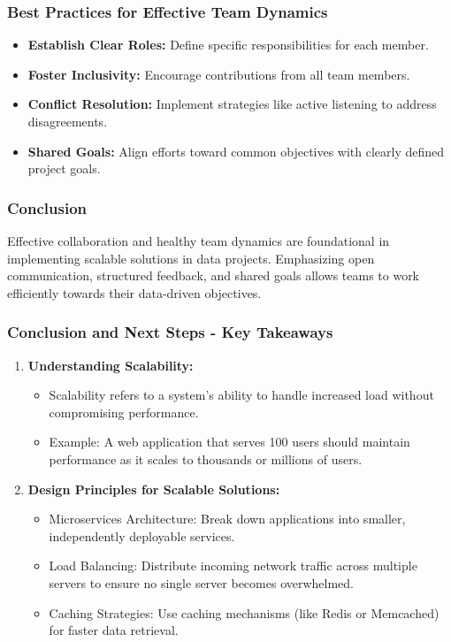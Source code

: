 \documentclass[aspectratio=169]{beamer}
\begin{document}
\begin{frame}[fragile]
    \frametitle{Best Practices for Effective Team Dynamics}
    \begin{itemize}
        \item \textbf{Establish Clear Roles:} Define specific responsibilities for each member.
        \item \textbf{Foster Inclusivity:} Encourage contributions from all team members.
        \item \textbf{Conflict Resolution:} Implement strategies like active listening to address disagreements.
        \item \textbf{Shared Goals:} Align efforts toward common objectives with clearly defined project goals.
    \end{itemize}
\end{frame}

\begin{frame}[fragile]
    \frametitle{Conclusion}
    Effective collaboration and healthy team dynamics are foundational in implementing scalable solutions in data projects. Emphasizing open communication, structured feedback, and shared goals allows teams to work efficiently towards their data-driven objectives.
\end{frame}

\begin{frame}[fragile]
    \frametitle{Conclusion and Next Steps - Key Takeaways}
    
    \begin{enumerate}
        \item \textbf{Understanding Scalability:}
        \begin{itemize}
            \item Scalability refers to a system's ability to handle increased load without compromising performance.
            \item Example: A web application that serves 100 users should maintain performance as it scales to thousands or millions of users.
        \end{itemize}

        \item \textbf{Design Principles for Scalable Solutions:}
        \begin{itemize}
            \item Microservices Architecture: Break down applications into smaller, independently deployable services.
            \item Load Balancing: Distribute incoming network traffic across multiple servers to ensure no single server becomes overwhelmed.
            \item Caching Strategies: Use caching mechanisms (like Redis or Memcached) for faster data retrieval.
        \end{itemize}
    \end{enumerate}
\end{frame}
\end{document}
